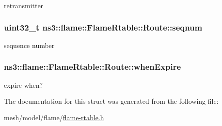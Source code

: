 retransmitter 

\subsubsection[{\texorpdfstring{seqnum}{seqnum}}]{\setlength{\rightskip}{0pt plus 5cm}uint32\+\_\+t ns3\+::flame\+::\+Flame\+Rtable\+::\+Route\+::seqnum}\hypertarget{structns3_1_1flame_1_1FlameRtable_1_1Route_a18f83d34a8719ce12569448105ad8ef0}{}\label{structns3_1_1flame_1_1FlameRtable_1_1Route_a18f83d34a8719ce12569448105ad8ef0}


sequence number 

\subsubsection[{\texorpdfstring{when\+Expire}{whenExpire}}]{ ns3\+::flame\+::\+Flame\+Rtable\+::\+Route\+::when\+Expire}\hypertarget{structns3_1_1flame_1_1FlameRtable_1_1Route_a3d66f8911652a87df41d83dececcbf5d}{}\label{structns3_1_1flame_1_1FlameRtable_1_1Route_a3d66f8911652a87df41d83dececcbf5d}


expire when? 



The documentation for this struct was generated from the following file\+:\begin{DoxyCompactItemize}
\item 
mesh/model/flame/\hyperlink{flame-rtable_8h}{flame-\/rtable.\+h}\end{DoxyCompactItemize}
